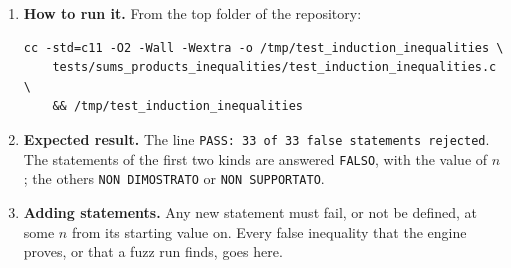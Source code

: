 \documentclass[11pt,a4paper]{article}
\begin{document}
\begin{enumerate}
\item \textbf{How to run it.} From the top folder of the repository:
\begin{verbatim}
cc -std=c11 -O2 -Wall -Wextra -o /tmp/test_induction_inequalities \
    tests/sums_products_inequalities/test_induction_inequalities.c \
    && /tmp/test_induction_inequalities
\end{verbatim}

\item \textbf{Expected result.} The line \texttt{PASS: 33 of 33 false statements rejected}. The statements of the first two kinds are answered \texttt{FALSO}, with the value of $n$; the others \texttt{NON DIMOSTRATO} or \texttt{NON SUPPORTATO}.

\item \textbf{Adding statements.} Any new statement must fail, or not be defined, at some $n$ from its starting value on. Every false inequality that the engine proves, or that a fuzz run finds, goes here.
\end{enumerate}
\end{document}
